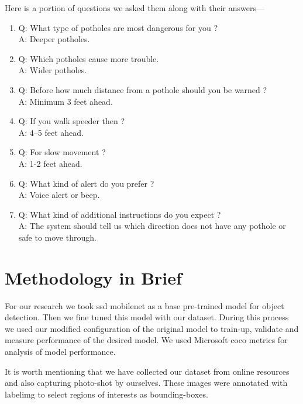     Here is a portion of questions we asked them along with their answers---
    \begin{enumerate}
        \item{Q: What type of potholes are most dangerous for you ? \\
        A: Deeper potholes.}
        
        \item{Q: Which potholes cause more trouble. \\
        A: Wider potholes.}
        
        \item{Q: Before how much distance from a pothole should you be warned ?\\
        A: Minimum 3 feet ahead.}
        
        \item{Q: If you walk speeder then ?\\
        A: 4--5 feet ahead.}
        
        \item{Q: For slow movement ?\\
        A: 1-2 feet ahead.}
        
        \item{Q: What kind of alert do you prefer ?\\
        A: Voice alert or beep.}
        
        \item{Q: What kind of additional instructions do you expect ?\\
        A: The system should tell us which direction does not have any pothole or safe to move through.}
    \end{enumerate}
    
\section{Methodology in Brief}
    For our research we took \acrfull{ssd} \gls{mobilenet} as a base pre-trained model for object detection. Then we fine tuned this model with our dataset. During this process we used our modified configuration of the original model to train-up, validate and measure performance of the desired model. We used Microsoft \acrfull{coco} metrics for analysis of model performance.
    
    It is worth mentioning that we have collected our dataset from online resources and also capturing photo-shot by ourselves. These images were annotated with \gls{labelimg} to select regions of interests as bounding-boxes.
    
